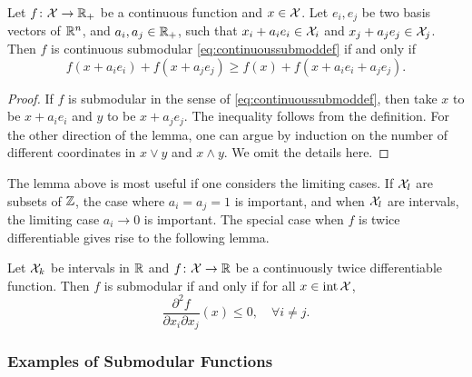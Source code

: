 \begin{lemma}
    Let $f\colon \mathcal{X}\to\mathbb{R}_+$ be a continuous function and $x\in\mathcal{X}$. Let $e_i, e_j$ be two basis vectors of $\mathbb{R}^n$, and $a_i, a_j \in \mathbb{R}_+$, such that $x_i + a_ie_i \in \mathcal{X}_i$ and $x_j + a_je_j \in \mathcal{X}_j$. Then $f$ is continuous submodular \eqref{eq:continuoussubmoddef} if and only if
    \begin{equation}\label{eq:contsubmoddef2}
        f(x + a_ie_i) + f(x + a_je_j) \geq f(x) + f(x + a_ie_i + a_je_j).
    \end{equation}
\end{lemma}
\begin{proof}
    If $f$ is submodular in the sense of \eqref{eq:continuoussubmoddef}, then take $x$ to be $x+a_ie_i$ and $y$ to be $x+a_je_j$. The inequality follows from the definition.  For the other direction of the lemma, one can argue by induction on the number of different coordinates in $x\vee y$ and $x\wedge y$. We omit the details here.
\end{proof}

The lemma above is most useful if one considers the limiting cases. If $\mathcal{X}_l$ are subsets of $\mathbb{Z}$, the case where $a_i = a_j = 1$ is important, and when $\mathcal{X}_l$ are intervals, the limiting case $a_i \to 0$ is important. The special case when $f$ is twice differentiable gives rise to the following lemma.

\begin{lemma}
    Let $\mathcal{X}_k$ be intervals in $\mathbb{R}$ and $f\colon \mathcal{X} \to \mathbb{R}$ be a continuously twice differentiable function. Then $f$ is submodular if and only if for all $x\in\mathop{\mathrm{int}}\mathcal{X}$,
    \[
        \frac{\partial^2 f}{\partial x_i \partial x_j} (x) \leq 0,\quad \forall i\neq j.
    \]
\end{lemma}

\subsubsection*{Examples of Submodular Functions}

